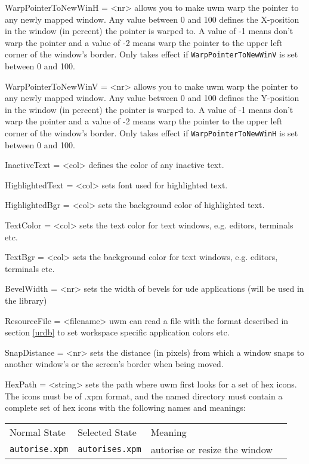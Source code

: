 \documentclass[10pt,a4paper]{article}
\newenvironment{ttdesc}[1]{
   \begin{list}{}{
          \renewcommand{\makelabel}[1]{\texttt{##1\hfill}}}}{\end{list}}
\begin{document}
\begin{ttdesc}{description}
\item[WarpPointerToNewWinH = <nr>] allows you to make uwm warp the pointer to any newly mapped window. Any value between 0 and 100 defines the X-position in the window (in percent) the pointer is warped to. A value of -1 means don't warp the pointer and a value of -2 means warp the pointer to the upper left corner of the window's border. Only takes effect if \texttt{WarpPointerToNewWinV} is set between 0 and 100.
\item[WarpPointerToNewWinV = <nr>] allows you to make uwm warp the pointer to any newly mapped window. Any value between 0 and 100 defines the Y-position in the window (in percent) the pointer is warped to. A value of -1 means don't warp the pointer and a value of -2 means warp the pointer to the upper left corner of the window's border. Only takes effect if \texttt{WarpPointerToNewWinH} is set between 0 and 100.
\item[InactiveText = <col>] defines the color of any inactive text.
\item[HighlightedText = <col>] sets font used for highlighted text.
\item[HighlightedBgr = <col>] sets the background color of highlighted text.
\item[TextColor = <col>] sets the text color for text windows, e.g. editors, terminals etc.
\item[TextBgr = <col>] sets the background color for text windows, e.g. editors, terminals etc.
\item[BevelWidth = <nr>] sets the width of bevels for ude applications (will be used in the library)
\item[ResourceFile = <filename>] uwm can read a file with the format described in section \ref{urdb} to set workspace specific application colors etc.
\item[SnapDistance = <nr>] sets the distance (in pixels) from which a window snaps to another window's or the screen's border when being moved.
\item[HexPath = <string>] sets the path where uwm first looks for a set of hex icons. The icons must be of \textsf{.xpm} format, and the named directory must contain a complete set of hex icons with the following names and meanings:\\
\begin{tabular}{ll p{5cm}l}
Normal State & Selected State & Meaning\\
\texttt{autorise.xpm} & \texttt{autorises.xpm} & autorise or resize the window\\

\end{tabular}
\end{ttdesc}
\end{document}
